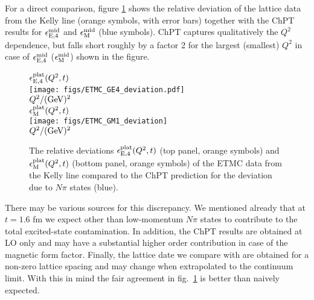 \documentclass[11pt,prd,aps,showpacs,eqsecnum,floatfix,nofootinbib,preprint,tightenlines]{revtex4}
\newcommand{\eV}[1]{\epsilon^{\rm mid}_{{\rm E},{#1}}}
\newcommand{\eM}{\epsilon^{\rm mid}_{\rm M}}
\begin{document}
For a direct comparison, figure \ref{fig:ETMCGM1dev} shows the relative deviation of the lattice data from the Kelly line (orange symbols, with error bars) together with the ChPT results for $\eV{4}$ and $\eM$ (blue symbols). 
ChPT captures qualitatively the $Q^2$ dependence, but falls short roughly by a factor 2 for the largest (smallest) $Q^2$ in case of $\eV{4}$ ($\eM$) shown in the figure.

% 
\begin{figure}[p]
\begin{center}
$\epsilon^{\rm plat}_{\rm E,4}(Q^2,t)$\\[0.6ex]
\texttt{[image: figs/ETMC\_GE4\_deviation.pdf]}\\[0.4ex]
$Q^2/({\rm GeV})^2$\\[6ex]
$\epsilon^{\rm plat}_{\rm M}(Q^2,t)$\\[0.6ex]
\texttt{[image: figs/ETMC\_GM1\_deviation]}\\[0.4ex]
$Q^2/({\rm GeV})^2$\\[0.8ex]
\caption{\label{fig:ETMCGM1dev} The relative deviations $\epsilon^{\rm plat}_{\rm E,4}(Q^2,t)$ (top panel, orange symbols) and $\epsilon^{\rm plat}_{\rm M}(Q^2,t)$ (bottom panel, orange symbols)
of the ETMC data \cite{Alexandrou:2018sjm} from the Kelly line compared to the ChPT prediction for the deviation due to $N\pi$ states (blue). 
}
\end{center} 
\end{figure}

There may be various sources for this discrepancy. We mentioned already that at $t=1.6$ fm we expect other than low-momentum $N\pi$ states to contribute to the total excited-state contamination. In addition, the ChPT results are obtained at LO only and may have a substantial higher order contribution in case of the magnetic form factor. Finally, the lattice date we compare with are obtained for a non-zero lattice spacing and may change when extrapolated to the continuum limit. With this in mind the fair agreement in fig.\ \ref{fig:ETMCGM1dev} 
is better than naively expected.
\end{document}
